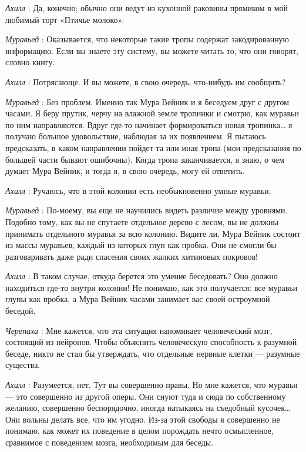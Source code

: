 \documentclass[../main.tex]{subfiles}
\begin{document}
\begin{dialogue}
\emph{Ахилл} : Да, конечно; обычно они ведут из кухонной раковины прямиком в мой любимый торт «Птичье молоко».

\emph{Муравьед} : Оказывается, что некоторые такие тропы содержат закодированную информацию. Если вы знаете эту систему, вы можете читать то, что они говорят, словно книгу.

\emph{Ахилл} : Потрясающе. И вы можете, в свою очередь, что-нибудь им сообщить?

\emph{Муравьед} : Без проблем. Именно так Мура Вейник и я беседуем друг с другом часами. Я беру прутик, черчу на влажной земле тропинки и смотрю, как муравьи по ним направляются. Вдруг где-то начинает формироваться новая тропинка\ldots{} я получаю большое удовольствие, наблюдая за их появлением. Я пытаюсь предсказать, в каком направлении пойдет та или иная тропа (мои предсказания по большей части бывают ошибочны). Когда тропа заканчивается, я знаю, о чем думает Мура Вейник, и тогда я, в свою очередь, могу ей ответить.

\emph{Ахилл} : Ручаюсь, что в этой колонии есть необыкновенно умные муравьи.

\emph{Муравьед} : По-моему, вы еще не научились видеть различие между уровнями. Подобно тому, как вы не спутаете отдельное дерево с лесом, вы не должны принимать отдельного муравья за всю колонию. Видите ли, Мура Вейник состоит из массы муравьев, каждый из которых глуп как пробка. Они не смогли бы разговаривать даже ради спасения своих жалких хитиновых покровов!

\emph{Ахилл} : В таком случае, откуда берется это умение беседовать? Оно должно находиться где-то внутри колонии! Не понимаю, как это получается: все муравьи глупы как пробка, а Мура Вейник часами занимает вас своей остроумной беседой.

\emph{Черепаха} : Мне кажется, что эта ситуация напоминает человеческий мозг, состоящий из нейронов. Чтобы объяснить человеческую способность к разумной беседе, никто не стал бы утверждать, что отдельные нервные клетки --- разумные существа.

\emph{Ахилл} : Разумеется, нет. Тут вы совершенно правы. Но мне кажется, что муравьи --- это совершенно из другой оперы. Они снуют туда и сюда по собственному желанию, совершенно беспорядочно, иногда натыкаясь на съедобный кусочек\ldots{} Они вольны делать все, что им угодно. Из-за этой свободы я совершенно не понимаю, как может их поведение в целом порождать нечто осмысленное, сравнимое с поведением мозга, необходимым для беседы.


\end{dialogue}
\end{document}
